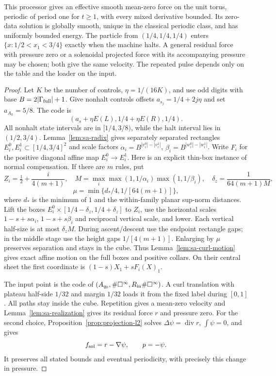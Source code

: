 \begin{theorem}\label{thm:sa-delimiter-history}
This processor gives an effective smooth mean-zero force on the unit
torus, periodic of period one for $t\ge1$, with every mixed derivative
bounded.  Its zero-data solution is globally smooth, unique in the
classical periodic class, and has uniformly bounded energy.  The particle
from $(1/4,1/4,1/4)$ enters $\{x:1/2<x_1<3/4\}$ exactly when the
machine halts.  A general residual force with pressure zero or a
solenoidal projected force with its accompanying pressure may be chosen;
both give the same velocity.  The repeated pulse depends only on the
table and the loader on the input.
\end{theorem}
\begin{proof}
Let $K$ be the number of controls, $\eta=1/(16K)$, and use odd digits
with base $B=2|\Gamma_{\rm full}|+1$.  Give nonhalt controls offsets
$a_{s_j}=1/4+2j\eta$ and set $a_{A_h}=5/8$.  The code is
\[
 (a_s+\eta E(L),1/4+\eta E(R),1/4).
\]
All nonhalt state intervals are in $[1/4,3/8)$, while the halt interval
lies in $(1/2,3/4)$.  Lemma~\ref{lem:sa-radix} gives separately separated
rectangles $E_i^0,E_i^1\subset[1/4,3/4]^2$ and scale factors
$\alpha_i=B^{|v_i^0|-|v_i^1|}$,
$\beta_i=B^{|w_i^0|-|w_i^1|}$.  Write $F_i$ for the positive
diagonal affine map $E_i^0\to E_i^1$.
Here is an explicit thin-box instance of normal compensation.  If there
are $m$ rules, put
\[
 Z_i=\tfrac12+\frac{i}{4(m+1)},\quad
 M=\max_i\max(1,1/\alpha_i)\max(1,1/\beta_i),\quad
 \delta_z=\frac1{64(m+1)M},
\]
\[
 \mu=\min\{d_*/4,1/[64(m+1)]\},
\]
where $d_*$ is the minimum of $1$ and the within-family planar
sup-norm distances.  Lift the boxes
$E_i^0\times[1/4-\delta_z,1/4+\delta_z]$ to $Z_i$, use the horizontal
scales $1-s+s\alpha_i$, $1-s+s\beta_i$ and reciprocal vertical scale,
and lower.  Each vertical half-size is at most $\delta_zM$.
During ascent/descent use the endpoint rectangle gaps; in the middle
stage use the height gaps $1/[4(m+1)]$.  Enlarging by $\mu$ preserves
separation and stays in the cube.  Thus Lemma~\ref{lem:sa-curl-motion}
gives exact affine motion on the full boxes and positive collars.
On their central sheet the first coordinate is
$(1-s)X_1+sF_i(X)_1$.

The input point is the code of
$(A_{q_0},\#\square^\infty,R_{\rm in}\#\square^\infty)$.
A curl translation with plateau half-side $1/32$ and margin $1/32$
loads it from the fixed label during $[0,1]$.  All paths stay inside
the cube.  Repetition gives a mean-zero velocity and
Lemma~\ref{lem:sa-realization} gives its residual force $r$ and pressure
zero.  For the second choice, Proposition~\ref{prop:projection-l2}
solves $\Delta\psi=\operatorname{div}r$, $\int\psi=0$, and gives
\[
 f_{\rm sol}=r-\nabla\psi,\qquad p=-\psi.
\]
It preserves all stated bounds and eventual periodicity, with precisely
this change in pressure.


\end{proof}
